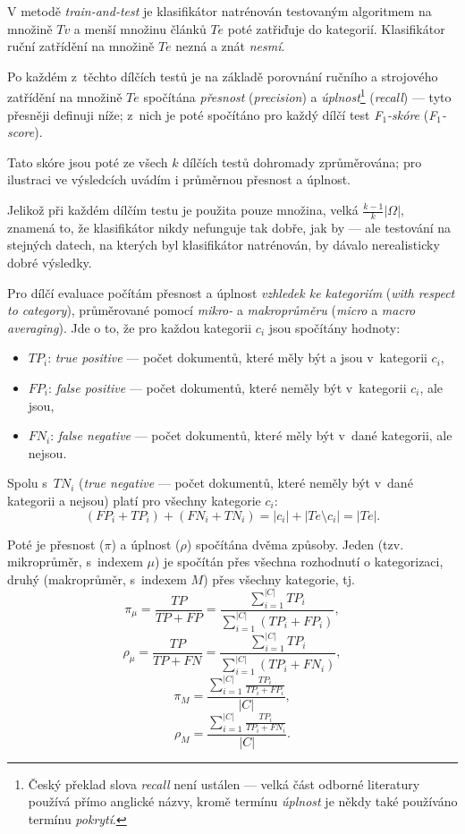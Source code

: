 \documentclass[12pt,a4paper]{report}
\begin{document}
V metodě \emph{train-and-test} je klasifikátor natrénován testovaným algoritmem na množině $Tv$ a menší množinu článků $Te$ poté zatřiďuje do kategorií. Klasifikátor ruční zatřídění na množině $Te$ nezná a znát \emph{nesmí}.

Po každém z~těchto dílčích testů je na základě porovnání ručního a strojového zatřídění na množině $Te$ spočítána \emph{přesnost} (\emph{precision}) a \emph{úplnost}\footnote{Český překlad slova \emph{recall} není ustálen --- velká část odborné literatury používá přímo anglické názvy, kromě termínu \emph{úplnost} je někdy také používáno termínu \emph{pokrytí}.} (\emph{recall}) --- tyto přesněji definuji níže; z~nich je poté spočítáno pro každý dílčí test \emph{F$_1$-skóre} (\emph{F$_1$-score}). 

Tato skóre jsou poté ze všech $k$ dílčích testů dohromady zprůměrována; pro ilustraci ve výsledcích uvádím i průměrnou přesnost a úplnost.

Jelikož při každém dílčím testu je použita pouze množina, velká $\frac{k-1}{k}\left|\Omega\right|,$ znamená to, že klasifikátor nikdy nefunguje tak dobře, jak by  --- ale testování na stejných datech, na kterých byl klasifikátor natrénován, by dávalo nerealisticky dobré výsledky.

Pro dílčí evaluace počítám přesnost a úplnost \emph{vzhledek ke kategoriím} (\emph{with respect to category}), průměrované pomocí \emph{mikro-} a \emph{makroprůměru} (\emph{micro} a \emph{macro averaging}). Jde o to, že pro každou kategorii $c_i$ jsou spočítány hodnoty:
\begin{itemize}
\item  $TP_i$: \emph{true positive} --- počet dokumentů, které měly být a jsou v~kategorii $c_i$,
\item $FP_i$: \emph{false positive} --- počet dokumentů, které neměly být v~kategorii $c_i$, ale jsou,
\item $FN_i$: \emph{false negative} --- počet dokumentů, které měly být v~dané kategorii, ale nejsou.
\end{itemize}
Spolu s~$TN_i$ (\emph{true negative} --- počet dokumentů, které neměly být v~dané kategorii a nejsou) platí pro všechny kategorie $c_i$:
 $$\left(FP_i+TP_i\right)+\left(FN_i+TN_i\right) = \left|c_i\right| + \left|Te \setminus c_i\right| = \left|Te\right|.$$

Poté je přesnost ($\pi$) a úplnost ($\rho$) spočítána dvěma způsoby. Jeden (tzv. mikroprůměr, s~indexem $\mu$) je spočítán přes všechna rozhodnutí o kategorizaci, druhý (makroprůměr, s~indexem $M$) přes všechny kategorie, tj. 
$$\pi_{\mu} = \frac{TP}{TP+FP} = \frac{\sum_{i=1}^{\left|C\right|}TP_i}{\sum_{i=1}^{\left|C\right|}\left(TP_i+FP_i\right)},$$ 
$$\rho_{\mu} = \frac{TP}{TP+FN} = \frac{\sum_{i=1}^{\left|C\right|}TP_i}{\sum_{i=1}^{\left|C\right|}\left(TP_i+FN_i\right)},$$ 
$$\pi_{M} = \frac{\sum_{i=1}^{\left|C\right|}\frac{TP_i}{TP_i+FP_i}}{\left|C\right|},$$ 
$$\rho_{M} = \frac{\sum_{i=1}^{\left|C\right|}\frac{TP_i}{TP_i+FN_i}}{\left|C\right|}.$$
\end{document}
